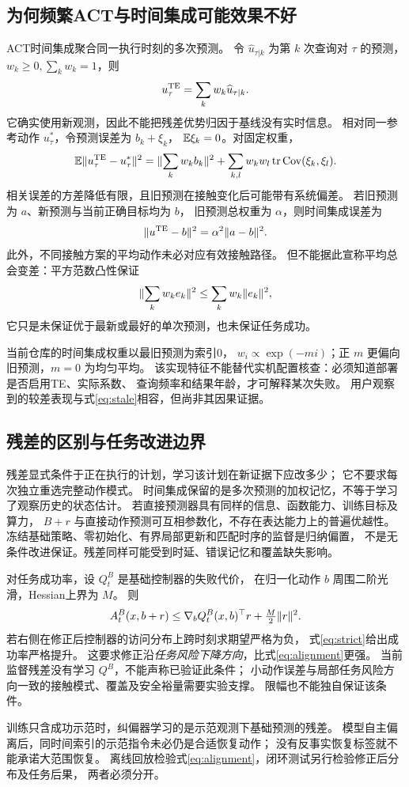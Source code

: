 \subsection{为何频繁ACT与时间集成可能效果不好}
ACT时间集成聚合同一执行时刻的多次预测\cite{zhao2023act}。
令 $\widehat u_{\tau|k}$ 为第 $k$ 次查询对 $\tau$ 的预测，
$w_k\ge0,\sum_kw_k=1$，则
\begin{equation}
 u_\tau^{\rm TE}=\sum_kw_k\widehat u_{\tau|k}.
\end{equation}
它确实使用新观测，因此不能把残差优势归因于基线没有实时信息。
相对同一参考动作 $u_\tau^*$，令预测误差为 $b_k+\xi_k$，
$\mathbb E\xi_k=0$。对固定权重，
\begin{equation}
 \mathbb E\lVert u_\tau^{\rm TE}-u_\tau^*\rVert^2
 =\lVert\sum_kw_k b_k\rVert^2+
 \sum_{k,l}w_kw_l\operatorname{tr}\operatorname{Cov}(\xi_k,\xi_l).
 \label{eq:te}
\end{equation}
相关误差的方差降低有限，且旧预测在接触变化后可能带有系统偏差。
若旧预测为 $a$、新预测与当前正确目标均为 $b$，
旧预测总权重为 $\alpha$，则时间集成误差为
\begin{equation}
 \lVert u^{\rm TE}-b\rVert^2=\alpha^2\lVert a-b\rVert^2.
 \label{eq:stale}
\end{equation}
此外，不同接触方案的平均动作未必对应有效接触路径。
但不能据此宣称平均总会变差：平方范数凸性保证
\begin{equation}
 \lVert\sum_kw_ke_k\rVert^2\le\sum_kw_k\lVert e_k\rVert^2,
\end{equation}
它只是未保证优于最新或最好的单次预测，也未保证任务成功。

当前仓库的时间集成权重以最旧预测为索引0，
$w_i\propto\exp(-mi)$；正 $m$ 更偏向旧预测，$m=0$ 为均匀平均。
该实现特征不能替代实机配置核查：必须知道部署是否启用TE、实际系数、
查询频率和结果年龄，才可解释某次失败。
用户观察到的较差表现与式\eqref{eq:stale}相容，但尚非其因果证据。

\subsection{残差的区别与任务改进边界}
残差显式条件于正在执行的计划，学习该计划在新证据下应改多少；
它不要求每次独立重选完整动作模式。
时间集成保留的是多次预测的加权记忆，不等于学习了观察历史的状态估计。
若直接预测器具有同样的信息、函数能力、训练目标及算力，
$B+r$ 与直接动作预测可互相参数化，不存在表达能力上的普遍优越性。
冻结基础策略、零初始化、有界局部更新和匹配时序的监督是归纳偏置，
不是无条件改进保证。残差同样可能受到时延、错误记忆和覆盖缺失影响。

对任务成功率，设 $Q_t^B$ 是基础控制器的失败代价，
在归一化动作 $b$ 周围二阶光滑，Hessian上界为 $M$。
则
\begin{equation}
 A_t^B(x,b+r)\le
 \nabla_b Q_t^B(x,b)^\top r+\tfrac M2\lVert r\rVert^2.
 \label{eq:taskres}
\end{equation}
若右侧在修正后控制器的访问分布上跨时刻求期望严格为负，
式\eqref{eq:strict}给出成功率严格提升。
这要求修正沿\emph{任务风险下降方向}，比式\eqref{eq:alignment}更强。
当前监督残差没有学习 $Q^B$，不能声称已验证此条件；
小动作误差与局部任务风险方向一致的接触模式、覆盖及安全裕量需要实验支撑。
限幅也不能独自保证该条件。

训练只含成功示范时，纠偏器学习的是示范观测下基础预测的残差。
模型自主偏离后，同时间索引的示范指令未必仍是合适恢复动作；
没有反事实恢复标签就不能承诺大范围恢复。
离线回放检验式\eqref{eq:alignment}，闭环测试另行检验修正后分布及任务后果，
两者必须分开。

